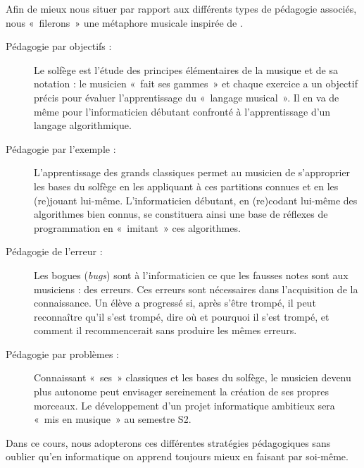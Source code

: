 Afin de mieux nous situer par rapport aux différents types de pédagogie
associés, nous «~filerons~» une métaphore musicale inspirée de \cite{charles}\label{cite:charles}.
\begin{description}
\item[Pédagogie par objectifs :]  Le solfège est l'étude des principes élémentaires
	de la musique et de sa notation : le musicien «~fait ses gammes~» et chaque exercice
	a un objectif précis pour évaluer l'apprentissage du «~langage musical~».
	Il en va de même pour l'informaticien débutant confronté à l'apprentissage d'un 
	langage algorithmique.
\item[Pédagogie par l'exemple :]  L'apprentissage des grands classiques 
	permet au musicien
	de s'ap\-pro\-prier les bases du solfège en les appliquant à ces partitions connues et en les
	(re)jouant lui-même. L'informaticien débutant, en (re)codant lui-même des algorithmes bien
	connus, se constituera ainsi une base de réflexes de programmation en «~imitant~» ces
	algorithmes.
\item[Pédagogie de l'erreur :]  Les bogues ({\em bugs}) sont à l'informaticien ce que les fausses notes
	sont aux musiciens : des erreurs. 
	Ces erreurs sont nécessaires dans l'acquisition de la connaissance.
	Un élève a progressé si, après s'être trompé,
	il peut reconnaître qu'il s'est trompé,  dire où et pourquoi il s'est trompé,
	et comment il recommencerait sans produire les mêmes erreurs.
\item[Pédagogie par problèmes :]  Connaissant «~ses~» classiques et les bases du solfège, le musicien
	devenu plus autonome peut envisager sereinement la création de ses propres morceaux.
	Le développement d'un projet informatique ambitieux sera «~mis en musique~» au semestre S2.
\end{description}

Dans ce cours, nous adopterons ces différentes stratégies pédagogiques sans oublier
qu'en informatique on apprend toujours mieux en faisant par soi-même.

